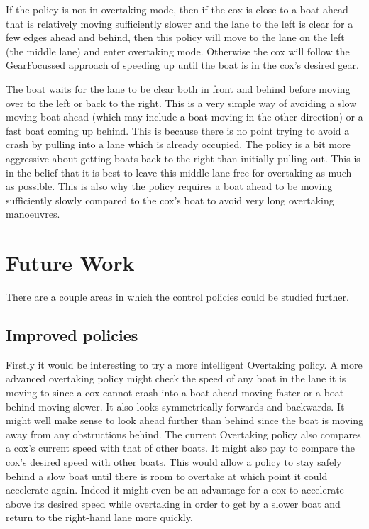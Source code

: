 If the policy is not in overtaking mode, then if the cox is close to a boat ahead that is relatively moving sufficiently slower and the lane to the left is clear for a few edges ahead and behind, then this policy will move to the lane on the left (the middle lane) and enter overtaking mode. Otherwise the cox will follow the GearFocussed approach of speeding up until the boat is in the cox's desired gear.

The boat waits for the lane to be clear both in front and behind before moving over to the left or back to the right. This is a very simple way of avoiding a slow moving boat ahead (which may include a boat moving in the other direction) or a fast boat coming up behind. This is because there is no point trying to avoid a crash by pulling into a lane which is already occupied. The policy is a bit more aggressive about getting boats back to the right than initially pulling out. This is in the belief that it is best to leave this middle lane free for overtaking as much as possible. This is also why the policy requires a boat ahead to be moving sufficiently slowly compared to the cox's boat to avoid very long overtaking manoeuvres.




\section{Future Work}
There are a couple areas in which the control policies could be studied further.

\subsection{Improved policies}
Firstly it would be interesting to try a more intelligent Overtaking policy. A more advanced overtaking policy might check the speed of any boat in the lane it is moving to since a cox cannot crash into a boat ahead moving faster or a boat behind moving slower. It also looks symmetrically forwards and backwards. It might well make sense to look ahead further than behind since the boat is moving away from any obstructions behind. The current Overtaking policy also compares a cox's current speed with that of other boats. It might also pay to compare the cox's desired speed with other boats. This would allow a policy to stay safely behind a slow boat until there is room to overtake at which point it could accelerate again. Indeed it might even be an advantage for a cox to accelerate above its desired speed while overtaking in order to get by a slower boat and return to the right-hand lane more quickly.

